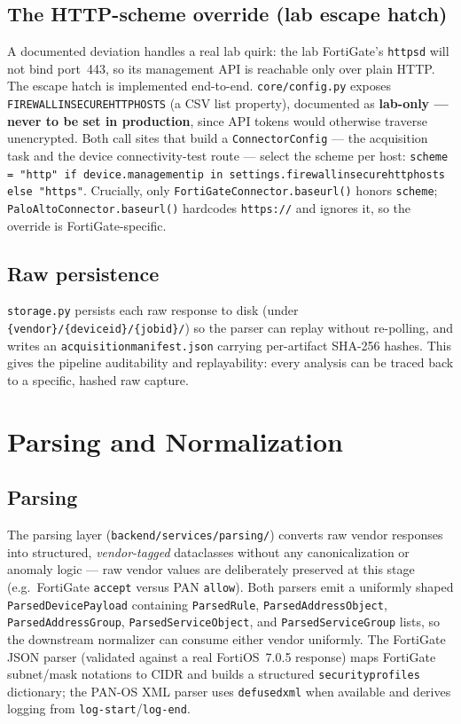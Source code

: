 \documentclass[12pt,a4paper]{report}
\renewcommand{\_}{\textunderscore\allowbreak}
\begin{document}
\subsection*{The HTTP-scheme override (lab escape hatch)}

A documented deviation handles a real lab quirk: the lab FortiGate's \texttt{httpsd} will not bind port~443, so its management API is reachable only over plain HTTP. The escape hatch is implemented end-to-end. \texttt{core/config.py} exposes \texttt{FIREWALL\_INSECURE\_HTTP\_HOSTS} (a CSV list property), documented as \textbf{lab-only --- never to be set in production}, since API tokens would otherwise traverse unencrypted. Both call sites that build a \texttt{ConnectorConfig} --- the acquisition task and the device connectivity-test route --- select the scheme per host: \texttt{scheme = "http" if device.management\_ip in settings.firewall\_insecure\_http\_hosts else "https"}. Crucially, only \texttt{FortiGateConnector.\_base\_url()} honors \texttt{scheme}; \texttt{PaloAltoConnector.\_base\_url()} hardcodes \texttt{https://} and ignores it, so the override is FortiGate-specific.

\subsection*{Raw persistence}

\texttt{storage.py} persists each raw response to disk (under \texttt{\{vendor\}/\{device\_id\}/\{job\_id\}/}) so the parser can replay without re-polling, and writes an \texttt{acquisition\_manifest.json} carrying per-artifact SHA-256 hashes. This gives the pipeline auditability and replayability: every analysis can be traced back to a specific, hashed raw capture.

\section{Parsing and Normalization}
\label{sec:ch4-parse-norm}

\subsection*{Parsing}

The parsing layer (\texttt{backend/services/parsing/}) converts raw vendor responses into structured, \emph{vendor-tagged} dataclasses without any canonicalization or anomaly logic --- raw vendor values are deliberately preserved at this stage (e.g.\ FortiGate \texttt{accept} versus PAN \texttt{allow}). Both parsers emit a uniformly shaped \texttt{ParsedDevicePayload} containing \texttt{ParsedRule}, \texttt{ParsedAddressObject}, \texttt{ParsedAddressGroup}, \texttt{ParsedServiceObject}, and \texttt{ParsedServiceGroup} lists, so the downstream normalizer can consume either vendor uniformly. The FortiGate JSON parser (validated against a real FortiOS~7.0.5 response) maps FortiGate subnet/mask notations to CIDR and builds a structured \texttt{security\_profiles} dictionary; the PAN-OS XML parser uses \texttt{defusedxml} when available and derives logging from \texttt{log-start}/\texttt{log-end}.
\end{document}
